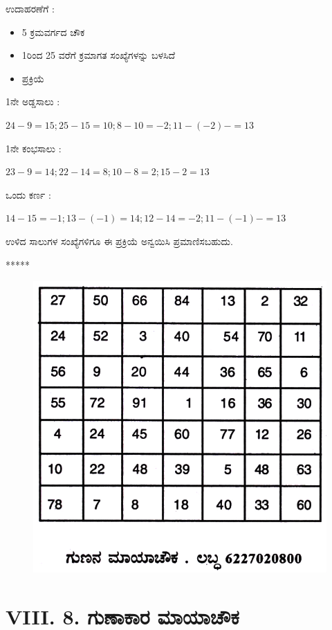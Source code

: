 ಉದಾಹರಣೆಗೆ :
\begin{itemize}
	\item 5 ಕ್ರಮವರ್ಗದ ಚೌಕ
	\item 1ರಿಂದ 25 ವರೆಗೆ ಕ್ರಮಾಗತ ಸಂಖ್ಯೆಗಳನ್ನು ಬಳಸಿದೆ
	\item ಪ್ರಕ್ರಿಯೆ
\end{itemize}

1ನೇ ಅಡ್ಡಸಾಲು :

$24-9=15; 25-15=10; 8-10=-2; 11-(-2)-= \boxed{13}$

1ನೇ ಕಂಭಸಾಲು :

$23-9=14; 22-14=8; 10-8=2; 15-2= \boxed{13}$

ಒಂದು ಕರ್ಣ :

$14-15=-1; 13-(-1)=14; 12-14=-2; 11-(-1)-= \boxed{13}$

ಉಳಿದ ಸಾಲುಗಳ ಸಂಖ್ಯೆಗಳಿಗೂ ಈ ಪ್ರಕ್ರಿಯೆ ಅನ್ವಯಿಸಿ ಪ್ರಮಾಣಿಸಬಹುದು.
\begin{center}
*****
\end{center}
\begin{figure}[H]
\includegraphics{src/figures/chap7/fig7-25.jpg}
\end{figure}

\section*{VIII. 8. ಗುಣಾಕಾರ ಮಾಯಾಚೌಕ}

